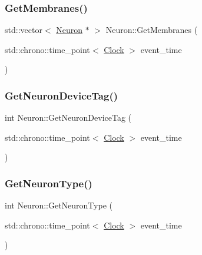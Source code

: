 \mbox{\label{classNeuron_ac759d9589c0505332e8238cafbc8fa66}} 
\subsubsection{\texorpdfstring{Get\+Membranes()}{GetMembranes()}}
{\footnotesize\ttfamily std\+::vector$<$ \mbox{\hyperlink{classNeuron}{Neuron}} $\ast$ $>$ Neuron\+::\+Get\+Membranes (\begin{DoxyParamCaption}\item[{std\+::chrono\+::time\+\_\+point$<$ \mbox{\hyperlink{universe_8h_a0ef8d951d1ca5ab3cfaf7ab4c7a6fd80}{Clock}} $>$}]{event\+\_\+time }\end{DoxyParamCaption})}

\mbox{\label{classNeuron_aff3a33f5d8ef5dacdec9c03df50f168c}} 
\subsubsection{\texorpdfstring{Get\+Neuron\+Device\+Tag()}{GetNeuronDeviceTag()}}
{\footnotesize\ttfamily int Neuron\+::\+Get\+Neuron\+Device\+Tag (\begin{DoxyParamCaption}\item[{std\+::chrono\+::time\+\_\+point$<$ \mbox{\hyperlink{universe_8h_a0ef8d951d1ca5ab3cfaf7ab4c7a6fd80}{Clock}} $>$}]{event\+\_\+time }\end{DoxyParamCaption})\hspace{0.3cm}{\ttfamily [inline]}}

\mbox{\label{classNeuron_a98f326ea86e6e8371b639609a4495c37}} 
\subsubsection{\texorpdfstring{Get\+Neuron\+Type()}{GetNeuronType()}}
{\footnotesize\ttfamily int Neuron\+::\+Get\+Neuron\+Type (\begin{DoxyParamCaption}\item[{std\+::chrono\+::time\+\_\+point$<$ \mbox{\hyperlink{universe_8h_a0ef8d951d1ca5ab3cfaf7ab4c7a6fd80}{Clock}} $>$}]{event\+\_\+time }\end{DoxyParamCaption})\hspace{0.3cm}{\ttfamily [inline]}}

